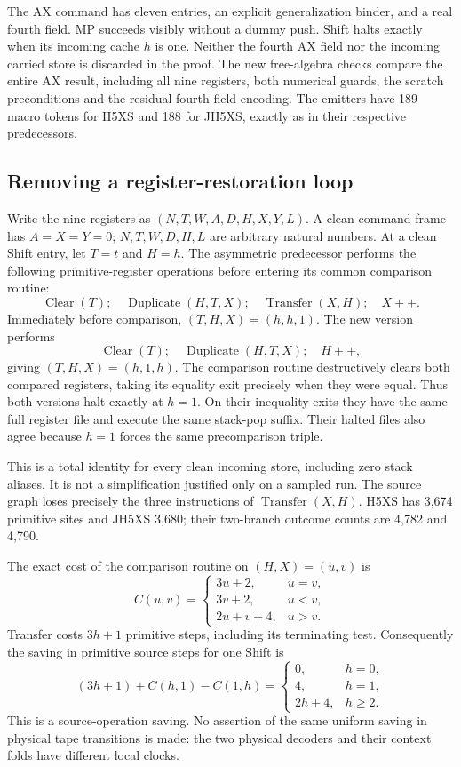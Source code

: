 The AX command has eleven entries, an explicit generalization binder,
and a real fourth field.  MP succeeds visibly without a dummy push.
Shift halts exactly when its incoming cache $h$ is one.  Neither the
fourth AX field nor the incoming carried store is discarded in the proof.
The new free-algebra checks compare the entire AX result, including all
nine registers, both numerical guards, the scratch preconditions and
the residual fourth-field encoding.  The emitters have 189 macro tokens
for H5XS and 188 for JH5XS, exactly as in their respective predecessors.

\subsection{Removing a register-restoration loop}

Write the nine registers as $(N,T,W,A,D,H,X,Y,L)$.  A clean command frame has $A=X=Y=0$;
$N,T,W,D,H,L$ are arbitrary natural numbers.  At a clean Shift
entry, let $T=t$ and $H=h$.  The asymmetric predecessor performs
the following primitive-register operations before entering its common
comparison routine:
\[
 \operatorname{Clear}(T);\quad
 \operatorname{Duplicate}(H,T,X);\quad
 \operatorname{Transfer}(X,H);\quad X{+}{+}.
\]
Immediately before comparison, $(T,H,X)=(h,h,1)$.
The new version performs
\[
 \operatorname{Clear}(T);\quad
 \operatorname{Duplicate}(H,T,X);\quad H{+}{+},
\]
giving $(T,H,X)=(h,1,h)$.  The comparison routine destructively clears
both compared registers, taking its equality exit precisely when they
were equal.  Thus both versions halt exactly at $h=1$.  On their
inequality exits they have the same full register file and execute the
same stack-pop suffix.  Their halted files also agree because $h=1$
forces the same precomparison triple.

This is a total identity for every clean incoming store, including zero
stack aliases.  It is not a simplification justified only on a sampled
run.  The source graph loses precisely the three instructions of
$\operatorname{Transfer}(X,H)$.  H5XS has 3,674 primitive sites and
JH5XS 3,680; their two-branch outcome counts are 4,782 and 4,790.

The exact cost of the comparison routine on $(H,X)=(u,v)$ is
\[
 C(u,v)=\begin{cases}
 3u+2,&u=v,\\
 3v+2,&u<v,\\
 2u+v+4,&u>v.
 \end{cases}
\]
Transfer costs $3h+1$ primitive steps, including its terminating test.
Consequently the saving in primitive source steps for one Shift is
\[
 (3h+1)+C(h,1)-C(1,h)
 =\begin{cases}0,&h=0,\\4,&h=1,\\2h+4,&h\ge2.\end{cases}
\]
This is a source-operation saving.  No assertion of the same uniform
saving in physical tape transitions is made: the two physical decoders
and their context folds have different local clocks.

